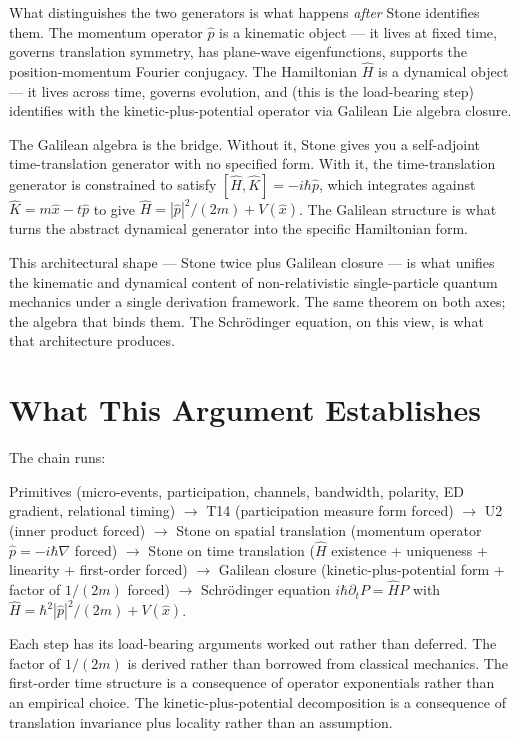 \documentclass[11pt,a4paper]{article}
\begin{document}
What distinguishes the two generators is what happens \emph{after} Stone identifies them. The momentum operator $\hat{p}$ is a kinematic object --- it lives at fixed time, governs translation symmetry, has plane-wave eigenfunctions, supports the position-momentum Fourier conjugacy. The Hamiltonian $\hat{H}$ is a dynamical object --- it lives across time, governs evolution, and (this is the load-bearing step) identifies with the kinetic-plus-potential operator via Galilean Lie algebra closure.

The Galilean algebra is the bridge. Without it, Stone gives you a self-adjoint time-translation generator with no specified form. With it, the time-translation generator is constrained to satisfy $[\hat{H}, \hat{K}] = -i\hbar\hat{p}$, which integrates against $\hat{K} = m\hat{x} - t\hat{p}$ to give $\hat{H} = |\hat{p}|^{2}/(2m) + V(\hat{x})$. The Galilean structure is what turns the abstract dynamical generator into the specific Hamiltonian form.

This architectural shape --- Stone twice plus Galilean closure --- is what unifies the kinematic and dynamical content of non-relativistic single-particle quantum mechanics under a single derivation framework. The same theorem on both axes; the algebra that binds them. The Schr\"odinger equation, on this view, is what that architecture produces.

\section{What This Argument Establishes}

The chain runs:

Primitives (micro-events, participation, channels, bandwidth, polarity, ED gradient, relational timing) $\to$ T14 (participation measure form forced) $\to$ U2 (inner product forced) $\to$ Stone on spatial translation (momentum operator $\hat{p} = -i\hbar\nabla$ forced) $\to$ Stone on time translation ($\hat{H}$ existence + uniqueness + linearity + first-order forced) $\to$ Galilean closure (kinetic-plus-potential form + factor of $1/(2m)$ forced) $\to$ Schr\"odinger equation $i\hbar\partial_t P = \hat{H} P$ with $\hat{H} = \hbar^{2}|\hat{p}|^{2}/(2m) + V(\hat{x})$.

Each step has its load-bearing arguments worked out rather than deferred. The factor of $1/(2m)$ is derived rather than borrowed from classical mechanics. The first-order time structure is a consequence of operator exponentials rather than an empirical choice. The kinetic-plus-potential decomposition is a consequence of translation invariance plus locality rather than an assumption.
\end{document}
